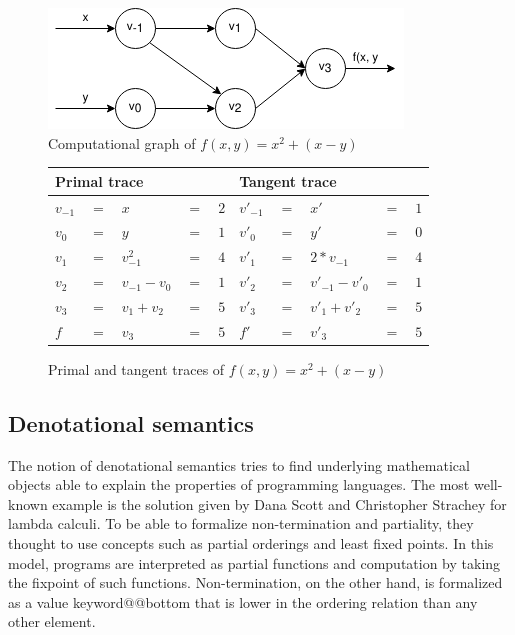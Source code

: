 \documentclass[12pt, final]{article}
\makeatletter
\def\<#1>{\csname keyword@@#1\endcsname}
\makeatother
\begin{document}
\begin{figure}[h]
  \centering
  \includegraphics[scale=0.6]{assets/function_trace.png}
  \caption{Computational graph of $f(x, y) = x^2 + (x - y)$}
  \label{fig:func_trace}
\end{figure}

\begin{figure}[h]
  \begin{center}
    \begin{tabular}{ l l l l l | l l l l l }
      \hline
      \multicolumn{5}{l}{Primal trace} & \multicolumn{5}{l}{Tangent trace} \\
      \hline
$v_{-1} $&$=$&$x$&$=$&$2$             &$v'_{-1}$&$=$&$x'$&$=$&$1$ \\
$v_0    $&$=$&$y$&$=$&$1$             &$v'_{0}$&$=$&$y'$&$=$&$0$ \\
      \hline
$v_1    $&$=$&$v_{-1}^2$&$=$&$4$      &$v'_{1}$&$=$&$2*v_{-1}$&$=$&$4$ \\
$v_2    $&$=$&$v_{-1} - v_{0}$&$=$&$1$&$v'_{2}$&$=$&$v'_{-1}-v'_{0}$&$=$&$1$ \\
$v_3    $&$=$&$v_1 + v_2$&$=$&$5$     &$v'_{3}$&$=$&$v'_1 + v'_2$&$=$&$5$ \\
      \hline
$f      $&$=$&$v_3$&$=$&$5$           &$f'$&$=$&$v'_3$&$=$&$5$ \\
      \hline
    \end{tabular}
  \end{center}
  \caption{Primal and tangent traces of $f(x, y) = x^2 + (x - y)$}
  \label{table:func_trace}
\end{figure}


\subsection{Denotational semantics}

The notion of denotational semantics tries to find underlying mathematical objects able to explain the properties of programming languages. The most well-known example is the solution given by Dana Scott and Christopher Strachey\cite{Scott1977} for lambda calculi.
To be able to formalize non-termination and partiality, they thought to use concepts such as partial orderings and least fixed points\cite{aaby2020}.
In this model, programs are interpreted as partial functions and computation by taking the fixpoint of such functions.
Non-termination, on the other hand, is formalized as a value \<bottom> that is lower in the ordering relation than any other element.
\end{document}
